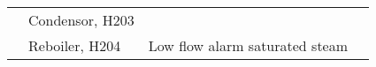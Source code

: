\begin{table}[]
{\begin{tabular}{@{}llll@{}}
\multicolumn{1}{|l|}{}                    & \multicolumn{1}{l|}{\multirow{3}{*}{Condensor, H203}}                                                      & \multicolumn{1}{l|}{}                                                                                                                                                                                                               & \multicolumn{1}{l|}{}                                                                                                                                                                                                                                                        \\ \cmidrule(l){3-4} 
\multicolumn{1}{|l|}{}                    & \multicolumn{1}{l|}{}                                                                                      & \multicolumn{1}{l|}{}                                                                                                                                                                                                               & \multicolumn{1}{l|}{}                                                                                                                                                                                                                                                        \\ \cmidrule(l){3-4} 
\multicolumn{1}{|l|}{}                    & \multicolumn{1}{l|}{}                                                                                      & \multicolumn{1}{l|}{}                                                                                                                                                                                                               & \multicolumn{1}{l|}{}                                                                                                                                                                                                                                                        \\ \cmidrule(l){2-4} 
\multicolumn{1}{|l|}{}                    & \multicolumn{1}{l|}{Reboiler, H204}                                                                        & \multicolumn{1}{l|}{Low flow alarm   saturated steam}                                                                                                                                                                               & \multicolumn{1}{l|}{}                                                                                                                                                                                                                                                        \\ \bottomrule
\end{tabular}%
}
\end{table}
